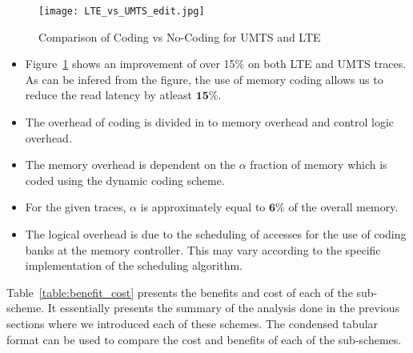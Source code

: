 
\begin{figure}[ht!]
\centering
\texttt{[image: LTE\_vs\_UMTS\_edit.jpg]}
\caption{Comparison of Coding vs No-Coding for UMTS and LTE}
\label{fig:lte_umts}
\end{figure}

\begin{itemize}
\item Figure~\ref{fig:lte_umts} shows an improvement of over 15$\%$ on both LTE and UMTS traces. As can be infered from the figure, the use of memory coding allows us to reduce the read latency by atleast $\mathbf{15\%}$.
\item The overhead of coding is divided in to memory overhead and control logic overhead. 
\item The memory overhead is dependent on the $\alpha$ fraction of memory which is coded using the dynamic coding scheme. 
\item For the given traces, $\alpha $ is approximately equal to $\mathbf{6\%}$ of the overall memory. 
\item The logical overhead is due to the scheduling of accesses for the use of coding banks at the memory controller. This may vary according to the specific implementation of the scheduling algorithm. 
\end{itemize}
Table~\ref{table:benefit_cost} presents the benefits and cost of each of the sub-scheme. It essentially presents the summary of the analysis done in the previous sections where we introduced each of these schemes. The condensed tabular format can be used to compare the cost and benefits of each of the sub-schemes. 
